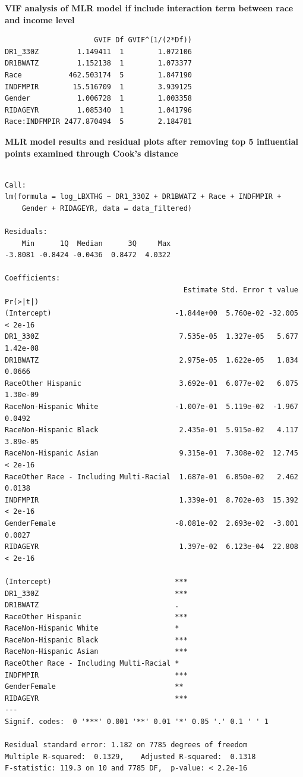 \documentclass[
  letterpaper,
  DIV=11,
  numbers=noendperiod]{scrartcl}
\begin{document}
\textbf{VIF analysis of MLR model if include interaction term between
race and income level}

\begin{verbatim}
                     GVIF Df GVIF^(1/(2*Df))
DR1_330Z         1.149411  1        1.072106
DR1BWATZ         1.152138  1        1.073377
Race           462.503174  5        1.847190
INDFMPIR        15.516709  1        3.939125
Gender           1.006728  1        1.003358
RIDAGEYR         1.085340  1        1.041796
Race:INDFMPIR 2477.870494  5        2.184781
\end{verbatim}

\textbf{MLR model results and residual plots after removing top 5
influential points examined through Cook's distance}

\begin{verbatim}

Call:
lm(formula = log_LBXTHG ~ DR1_330Z + DR1BWATZ + Race + INDFMPIR + 
    Gender + RIDAGEYR, data = data_filtered)

Residuals:
    Min      1Q  Median      3Q     Max 
-3.8081 -0.8424 -0.0436  0.8472  4.0322 

Coefficients:
                                          Estimate Std. Error t value Pr(>|t|)
(Intercept)                             -1.844e+00  5.760e-02 -32.005  < 2e-16
DR1_330Z                                 7.535e-05  1.327e-05   5.677 1.42e-08
DR1BWATZ                                 2.975e-05  1.622e-05   1.834   0.0666
RaceOther Hispanic                       3.692e-01  6.077e-02   6.075 1.30e-09
RaceNon-Hispanic White                  -1.007e-01  5.119e-02  -1.967   0.0492
RaceNon-Hispanic Black                   2.435e-01  5.915e-02   4.117 3.89e-05
RaceNon-Hispanic Asian                   9.315e-01  7.308e-02  12.745  < 2e-16
RaceOther Race - Including Multi-Racial  1.687e-01  6.850e-02   2.462   0.0138
INDFMPIR                                 1.339e-01  8.702e-03  15.392  < 2e-16
GenderFemale                            -8.081e-02  2.693e-02  -3.001   0.0027
RIDAGEYR                                 1.397e-02  6.123e-04  22.808  < 2e-16
                                           
(Intercept)                             ***
DR1_330Z                                ***
DR1BWATZ                                .  
RaceOther Hispanic                      ***
RaceNon-Hispanic White                  *  
RaceNon-Hispanic Black                  ***
RaceNon-Hispanic Asian                  ***
RaceOther Race - Including Multi-Racial *  
INDFMPIR                                ***
GenderFemale                            ** 
RIDAGEYR                                ***
---
Signif. codes:  0 '***' 0.001 '**' 0.01 '*' 0.05 '.' 0.1 ' ' 1

Residual standard error: 1.182 on 7785 degrees of freedom
Multiple R-squared:  0.1329,    Adjusted R-squared:  0.1318 
F-statistic: 119.3 on 10 and 7785 DF,  p-value: < 2.2e-16
\end{verbatim}
\end{document}
